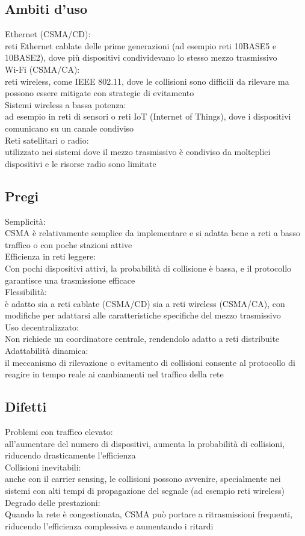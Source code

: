 \documentclass[10pt,oneside,a4paper]{article}
\begin{document}
\subsection{Ambiti d'uso}
Ethernet (CSMA/CD):\\
reti Ethernet cablate delle prime generazioni (ad esempio reti 10BASE5 e 10BASE2), dove più dispositivi condividevano lo stesso mezzo trasmissivo\\
Wi-Fi (CSMA/CA):\\
reti wireless, come IEEE 802.11, dove le collisioni sono difficili da rilevare ma possono essere mitigate con strategie di evitamento\\
Sistemi wireless a bassa potenza:\\
ad esempio in reti di sensori o reti IoT (Internet of Things), dove i dispositivi comunicano su un canale condiviso\\
Reti satellitari o radio:\\
utilizzato nei sistemi dove il mezzo trasmissivo è condiviso da molteplici dispositivi e le risorse radio sono limitate
\subsection{Pregi}
Semplicità:\\
CSMA è relativamente semplice da implementare e si adatta bene a reti a basso traffico o con poche stazioni attive\\
Efficienza in reti leggere:\\
Con pochi dispositivi attivi, la probabilità di collisione è bassa, e il protocollo garantisce una trasmissione efficace\\
Flessibilità:\\
è adatto sia a reti cablate (CSMA/CD) sia a reti wireless (CSMA/CA), con modifiche per adattarsi alle caratteristiche specifiche del mezzo trasmissivo\\
Uso decentralizzato:\\
Non richiede un coordinatore centrale, rendendolo adatto a reti distribuite\\
Adattabilità dinamica:\\
il meccanismo di rilevazione o evitamento di collisioni consente al protocollo di reagire in tempo reale ai cambiamenti nel traffico della rete
\subsection{Difetti}
Problemi con traffico elevato:\\
all'aumentare del numero di dispositivi, aumenta la probabilità di collisioni, riducendo drasticamente l'efficienza\\
Collisioni inevitabili:\\
anche con il carrier sensing, le collisioni possono avvenire, specialmente nei sistemi con alti tempi di propagazione del segnale (ad esempio reti wireless)\\
Degrado delle prestazioni:\\
Quando la rete è congestionata, CSMA può portare a ritrasmissioni frequenti, riducendo l'efficienza complessiva e aumentando i ritardi
\end{document}
